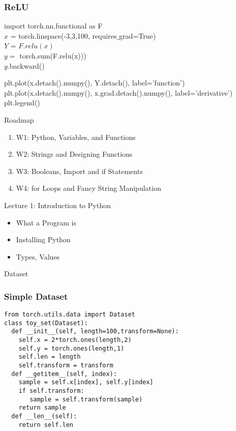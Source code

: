 \documentclass[14 pt]{beamer}
\let\olditem\item
\renewcommand{\item}{\olditem\vspace{4pt}}
\newcommand{\Alert}[1]{\textcolor{Alert}{#1}} %
\begin{document}
\begin{frame}
  \frametitle{ReLU}
  \begin{block}{}
    import torch.nn.functional as F\\
    $x$ = torch.linspace(-3,3,100, requires$\_$grad=True)\\
    $Y$ = $F.relu(x)$ \\
    $y = $ torch.sum(F.relu(x))) \\
    $y$.backward()
  \end{block}
  \begin{block}{}
    plt.plot(x.detach().numpy(), Y.detach(), label='function')\\
plt.plot(x.detach().numpy(), x.grad.detach().numpy(), label='derivative')\\
plt.legend()
  \end{block}
\end{frame}

\begin{frame}{Roadmap}
  \begin{enumerate}
[circle]
  \item \Alert{W1: Python, Variables, and Functions}
  \item W2: Strings and Designing Functions
  \item W3: Booleans, Import and if Statements
  \item W4: for Loops and Fancy String Manipulation
  \end{enumerate}
  \begin{block}{Lecture 1: Introduction to Python}
      \begin{itemize}
  \item What a Program is
  \item  Installing Python
  \item Types, Values
  \end{itemize}
  \end{block}
\end{frame}

\begin{frame}
\begin{center}
\Large{Dataset}
\end{center}
\end{frame}

\begin{frame}[fragile]
  \frametitle{Simple Dataset}
  \begin{block}{}
\small{
\begin{verbatim}
from torch.utils.data import Dataset 
class toy_set(Dataset):
  def __init__(self, length=100,transform=None):
    self.x = 2*torch.ones(length,2) 
    self.y = torch.ones(length,1)
    self.len = length
    self.transform = transform
  def __getitem__(self, index):
    sample = self.x[index], self.y[index]
    if self.transform:
       sample = self.transform(sample)
    return sample
  def __len__(self):
    return self.len
\end{verbatim}
}
  \end{block}
\end{frame}
\end{document}

